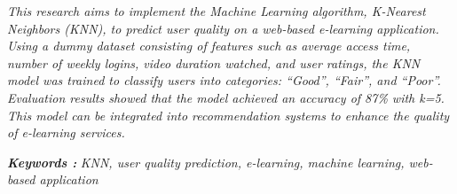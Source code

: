 \begin{abstracteng}

\textit{This research aims to implement the Machine Learning algorithm, K-Nearest Neighbors (KNN), to predict user quality on a web-based e-learning application. Using a dummy dataset consisting of features such as average access time, number of weekly logins, video duration watched, and user ratings, the KNN model was trained to classify users into categories: “Good”, “Fair”, and “Poor”. Evaluation results showed that the model achieved an accuracy of 87\% with k=5. This model can be integrated into recommendation systems to enhance the quality of e-learning services.}

\bigskip
\noindent
\textit{\textbf{Keywords :}} \textit{KNN, user quality prediction, e-learning, machine learning, web-based application}
\end{abstracteng}